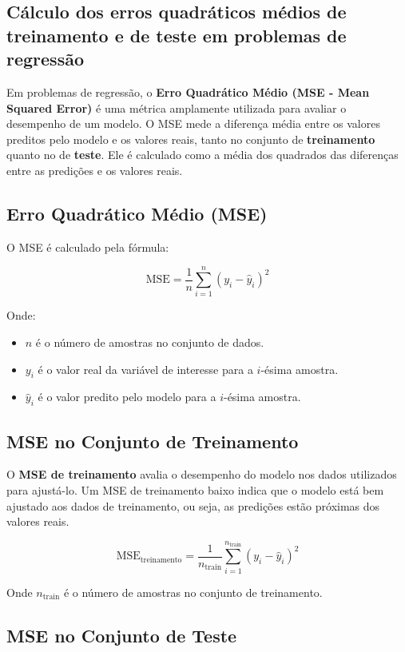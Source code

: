 \documentclass{sciposter}
\begin{document}
\begin{multicols}{3}
\section{Cálculo dos erros quadráticos médios de treinamento e de teste em problemas de regressão}

Em problemas de regressão, o \textbf{Erro Quadrático Médio (MSE - Mean Squared Error)} é uma métrica amplamente utilizada para avaliar o desempenho de um modelo. O MSE mede a diferença média entre os valores preditos pelo modelo e os valores reais, tanto no conjunto de \textbf{treinamento} quanto no de \textbf{teste}. Ele é calculado como a média dos quadrados das diferenças entre as predições e os valores reais.

\subsection{Erro Quadrático Médio (MSE)}

O MSE é calculado pela fórmula:

\[
\text{MSE} = \frac{1}{n} \sum_{i=1}^{n} (y_i - \hat{y}_i)^2
\]

Onde:
\begin{itemize}
    \item $n$ é o número de amostras no conjunto de dados.
    \item $y_i$ é o valor real da variável de interesse para a $i$-ésima amostra.
    \item $\hat{y}_i$ é o valor predito pelo modelo para a $i$-ésima amostra.
\end{itemize}

\subsection{MSE no Conjunto de Treinamento}

O \textbf{MSE de treinamento} avalia o desempenho do modelo nos dados utilizados para ajustá-lo. Um MSE de treinamento baixo indica que o modelo está bem ajustado aos dados de treinamento, ou seja, as predições estão próximas dos valores reais.

\[
\text{MSE}_{\text{treinamento}} = \frac{1}{n_{\text{train}}} \sum_{i=1}^{n_{\text{train}}} (y_i - \hat{y}_i)^2
\]

Onde $n_{\text{train}}$ é o número de amostras no conjunto de treinamento.

\subsection{MSE no Conjunto de Teste}


\end{multicols}
\end{document}
